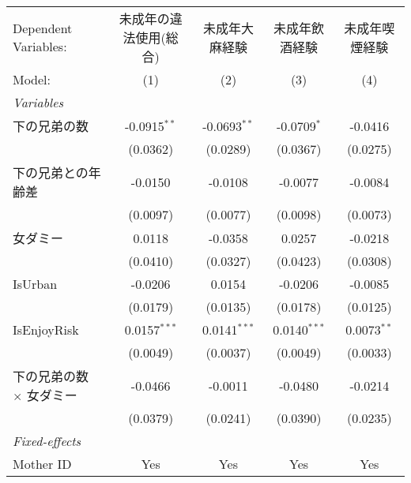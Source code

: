 \documentclass{article}
\begin{document}
\begin{landscape}


\begingroup
\centering
\begin{tabular}{lcccc}
   \tabularnewline \midrule \midrule
   Dependent Variables:            & 未成年の違法使用(総合) & 未成年大麻経験 & 未成年飲酒経験 & 未成年喫煙経験\\  
   Model:                          & (1)                    & (2)            & (3)            & (4)\\  
   \midrule
   \emph{Variables}\\
   下の兄弟の数                    & -0.0915$^{**}$         & -0.0693$^{**}$ & -0.0709$^{*}$  & -0.0416\\   
                                   & (0.0362)               & (0.0289)       & (0.0367)       & (0.0275)\\   
   下の兄弟との年齢差              & -0.0150                & -0.0108        & -0.0077        & -0.0084\\   
                                   & (0.0097)               & (0.0077)       & (0.0098)       & (0.0073)\\   
   女ダミー                        & 0.0118                 & -0.0358        & 0.0257         & -0.0218\\   
                                   & (0.0410)               & (0.0327)       & (0.0423)       & (0.0308)\\   
   IsUrban                         & -0.0206                & 0.0154         & -0.0206        & -0.0085\\   
                                   & (0.0179)               & (0.0135)       & (0.0178)       & (0.0125)\\   
   IsEnjoyRisk                     & 0.0157$^{***}$         & 0.0141$^{***}$ & 0.0140$^{***}$ & 0.0073$^{**}$\\   
                                   & (0.0049)               & (0.0037)       & (0.0049)       & (0.0033)\\   
   下の兄弟の数 $\times$ 女ダミー  & -0.0466                & -0.0011        & -0.0480        & -0.0214\\   
                                   & (0.0379)               & (0.0241)       & (0.0390)       & (0.0235)\\   
   \midrule
   \emph{Fixed-effects}\\
   Mother ID                       & Yes                    & Yes            & Yes            & Yes\\  

\end{tabular}
\end{landscape}
\end{document}
